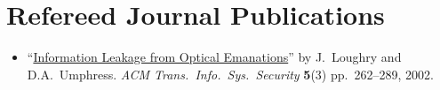 \section*{Refereed Journal Publications}
\vspace{-3mm}

\begin{itemize}
	\item ``\href{http://dl.acm.org/citation.cfm?doid=545186.545189}{Information
		Leakage from Optical Emanations}'' by J.\ Loughry and D.A.\ Umphress.
		\emph{ACM Trans.\ Info.\ Sys.\ Security} \textbf{5}(3)
		pp.\ 262--289, 2002.
\end{itemize}

